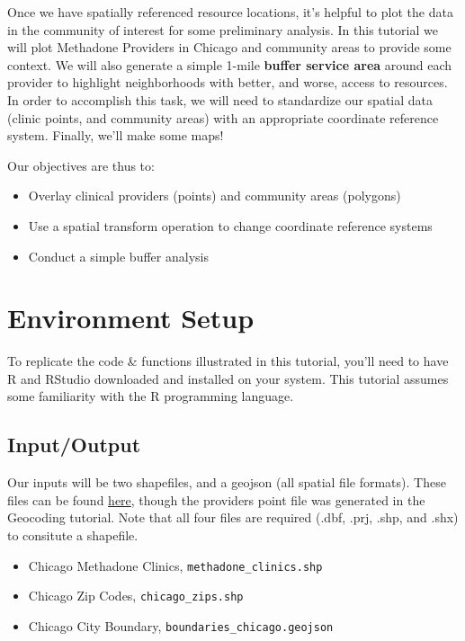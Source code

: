 \documentclass[
  letterpaper,
  DIV=11,
  numbers=noendperiod]{scrreprt}
\providecommand{\tightlist}{%
  \setlength{\itemsep}{0pt}\setlength{\parskip}{0pt}}
\begin{document}
Once we have spatially referenced resource locations, it's helpful to
plot the data in the community of interest for some preliminary
analysis. In this tutorial we will plot Methadone Providers in Chicago
and community areas to provide some context. We will also generate a
simple 1-mile \textbf{buffer service area} around each provider to
highlight neighborhoods with better, and worse, access to resources. In
order to accomplish this task, we will need to standardize our spatial
data (clinic points, and community areas) with an appropriate coordinate
reference system. Finally, we'll make some maps!

Our objectives are thus to:

\begin{itemize}
\tightlist
\item
  Overlay clinical providers (points) and community areas (polygons)
\item
  Use a spatial transform operation to change coordinate reference
  systems
\item
  Conduct a simple buffer analysis
\end{itemize}

\section{Environment Setup}\label{BA-setup}

To replicate the code \& functions illustrated in this tutorial, you'll
need to have R and RStudio downloaded and installed on your system. This
tutorial assumes some familiarity with the R programming language.

\subsection{Input/Output}\label{BA-i-o}

Our inputs will be two shapefiles, and a geojson (all spatial file
formats). These files can be found
\href{https://github.com/GeoDaCenter/opioid-environment-toolkit/tree/master/data}{here},
though the providers point file was generated in the Geocoding tutorial.
Note that all four files are required (.dbf, .prj, .shp, and .shx) to
consitute a shapefile.

\begin{itemize}
\tightlist
\item
  Chicago Methadone Clinics, \texttt{methadone\_clinics.shp}
\item
  Chicago Zip Codes, \texttt{chicago\_zips.shp}
\item
  Chicago City Boundary, \texttt{boundaries\_chicago.geojson}
\end{itemize}
\end{document}
